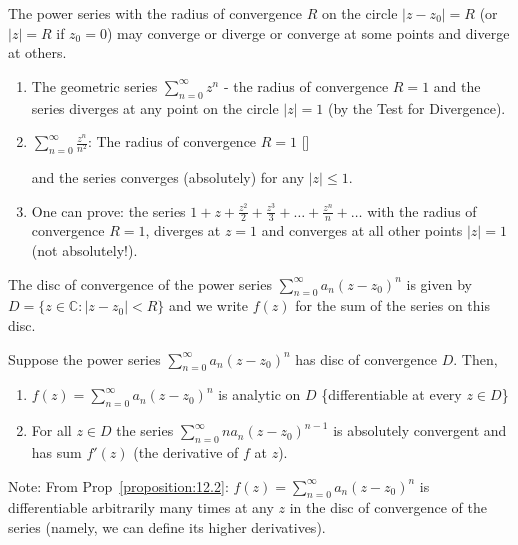 \begin{remark}
    The power series with the radius of convergence $R$ on the circle $|z - z_0| = R$ (or $|z| = R$ if $z_0 = 0$) may converge or diverge or converge at some points and diverge at others.
\end{remark}

\begin{example}\label{example:14.2} 
    \begin{enumerate}
        \item The geometric series $\sum_{n=0}^{\infty} z^n$ - the radius of convergence $R = 1$ and the series diverges at any point on the circle $|z| = 1$ (by the Test for Divergence).
        \item $\sum_{n=0}^{\infty} \frac{z^n}{n^2}$: The radius of convergence $R = 1$ [\verifythis]
        
        and the series converges (absolutely) for any $|z| \leq 1$.
        \item One can prove: the series $1 + z + \frac{z^2}{2} + \frac{z^3}{3} + \dots + \frac{z^n}{n} + \dots$ with the radius of convergence $R = 1$, diverges at $z = 1$ and converges at 
        all other points $|z| = 1$ (not absolutely!).
    \end{enumerate}
\end{example}

\begin{definition}\label{definition:12.3} The disc of convergence of the power series $\sum_{n=0}^{\infty} a_n (z - z_0)^n$ is given by $D = \{z \in \mathbb{C}: |z - z_0| < R\}$ and we 
    write $f(z)$ for the sum of the series on this disc.
\end{definition}

\begin{proposition} \label{proposition:12.2} Suppose the power series $\sum_{n=0}^{\infty} a_n (z - z_0)^n$ has disc of convergence $D$. Then,
    \begin{enumerate}
        \item $f(z) = \sum_{n=0}^{\infty} a_n (z - z_0)^n$ is analytic on $D$ \{differentiable at every $z \in D$\}
        \item For all $z \in D$ the series $\sum_{n=0}^{\infty} na_n (z - z_0)^{n-1}$ is absolutely convergent and has sum $f'(z)$ (the derivative of $f$ at $z$).
    \end{enumerate}
\end{proposition}

Note: From Prop~\ref{proposition:12.2}: $f(z) = \sum_{n=0}^{\infty} a_n (z - z_0)^n$ is differentiable arbitrarily many times at any $z$ in the disc of convergence 
of the series (namely, we can define its higher derivatives).


